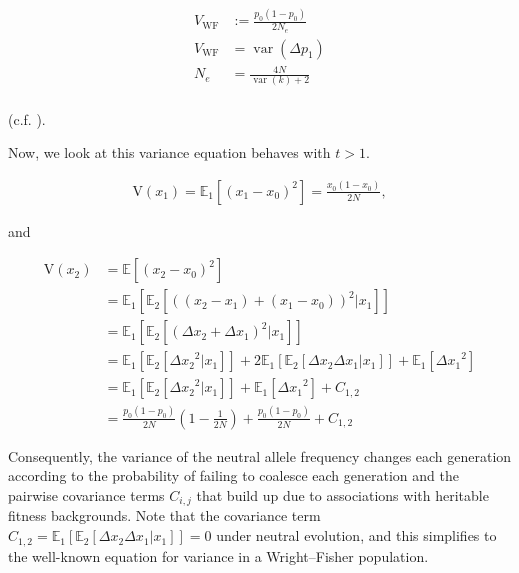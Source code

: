 \documentclass[11pt]{article}
\newcommand{\E}{\mathbb{E}}
\newcommand{\V}{\text{V}}
\DeclareMathOperator{\var}{var}
\begin{document}
\begin{align}
  V_\text{WF} &:= \frac{p_0(1-p_0)}{2N_e} \\
  V_\text{WF} &= \var(\Delta p_1) \\
  N_e &= \frac{4N}{\var(k) + 2} \\
\end{align}

(c.f. \cite{Wright1938-tv}).

Now, we look at this variance equation behaves with $t > 1$. 

\begin{align}
  \V(x_1) = \E_1\left[(x_1 - x_0)^2\right]= \frac{x_0(1-x_0)}{2N},
\end{align}

and

\begin{align}
  \V(x_2) &= \E\left[(x_2 - x_0)^2\right] \\
          &= \E_1\left[\E_2\left[((x_2-x_1) + (x_1 - x_0))^2 | x_1\right]\right] \\
          &= \E_1\left[\E_2\left[(\Delta x_2 + \Delta x_1)^2 | x_1\right]\right] \\
          &= \E_1\left[\E_2\left[{\Delta x_2}^2|x_1\right]\right] + 2\E_1\left[\E_2[\Delta x_2 \Delta x_1 | x_1]\right] + \E_1\left[ {\Delta x_1}^2\right] \\
          &= \E_1\left[\E_2\left[{\Delta x_2}^2|x_1\right]\right] + \E_1\left[ {\Delta x_1}^2\right] + C_{1,2} \\
          &= \frac{p_0(1-p_0)}{2N}\left(1 - \frac{1}{2N}\right) + \frac{p_0(1-p_0)}{2N} + C_{1,2}
\end{align}

Consequently, the variance of the neutral allele frequency changes each
generation according to the probability of failing to coalesce each generation
and the pairwise covariance terms $C_{i,j}$ that build up due to associations
with heritable fitness backgrounds. Note that the covariance term $C_{1,2} =
\E_1\left[\E_2[\Delta x_2 \Delta x_1 | x_1]\right] = 0$ under neutral
evolution, and this simplifies to the well-known equation for variance in a
Wright--Fisher population.





\end{document}
